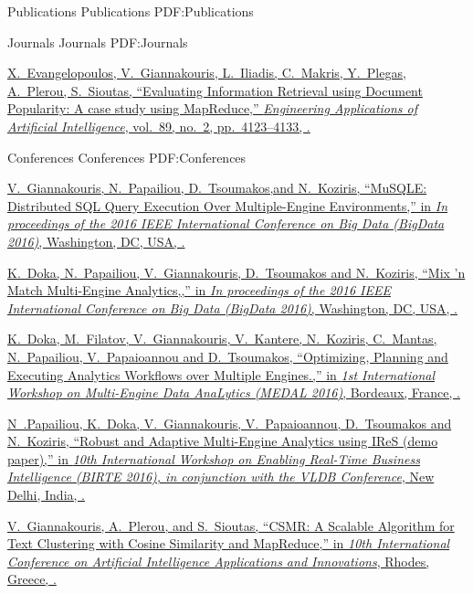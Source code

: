 
\Section
{Publications}
{Publications}
{PDF:Publications}

\SubSection
{Journals}
{Journals}
{PDF:Journals}

\begingroup
\renewcommand{\MaxNumberedItem}{[88]}

\BigGap
\NumberedItem{[1]}
\href{http://www.example.com/my-paper-doi-5}
{X.~Evangelopoulos, \underline{V.~Giannakouris}, L.~Iliadis, C.~Makris, Y.~Plegas, A.~Plerou, S.~Sioutas,
``Evaluating Information Retrieval using Document Popularity: A case
study using MapReduce,''
\textit{Engineering Applications of Artificial Intelligence},
vol.~89,
no.~2,
pp.~4123--4133,
.}

\endgroup

\BigGap
\SubSection
{Conferences}
{Conferences}
{PDF:Conferences}

\begingroup
\renewcommand{\MaxNumberedItem}{[8888]}

\BigGap
\Gap
\NumberedItem{[1]}
\href{http://www.example.com/my-paper-doi-3}
{\underline{V.~Giannakouris}, N.~Papailiou, D.~Tsoumakos,and N.~Koziris,
	``MuSQLE: Distributed SQL Query Execution Over Multiple-Engine Environments,''
	in \textit{In proceedings of the 2016 IEEE International Conference on Big Data (BigData 2016)},
	Washington, DC, USA,
	.}

\NumberedItem{[2]}
\href{http://www.example.com/my-paper-doi-3}
{K.~Doka, N.~Papailiou, \underline{V.~Giannakouris}, D.~Tsoumakos and N.~Koziris,
``Mix 'n Match Multi-Engine Analytics,,''
in \textit{In proceedings of the 2016 IEEE International Conference on Big Data (BigData 2016)},
Washington, DC, USA,
.}

\NumberedItem{[3]}
\href{http://www.example.com/my-paper-doi-3}
{K.~Doka, M.~Filatov, \underline{V.~Giannakouris}, V.~Kantere, N.~Koziris,
	C.~Mantas, N.~Papailiou, V.~Papaioannou and D.~Tsoumakos,
	``Optimizing, Planning and Executing Analytics Workflows over Multiple Engines.,''
	in \textit{1st International Workshop on Multi-Engine Data AnaLytics (MEDAL 2016)},
	Bordeaux, France,
.}

\NumberedItem{[4]}
\href{http://www.example.com/my-paper-doi-3}
{N~.Papailiou, K.~Doka, \underline{V.~Giannakouris}, V.~Papaioannou, D.~Tsoumakos and N.~Koziris,
	``Robust and Adaptive Multi-Engine Analytics using IReS (demo paper),''
	in \textit{10th International Workshop on Enabling Real-Time Business Intelligence (BIRTE 2016), in conjunction with the VLDB Conference},
	New Delhi, India,
	.}

\NumberedItem{[5]}
\href{http://www.example.com/my-paper-doi-3}
{\underline{V.~Giannakouris}, A.~Plerou, and S.~Sioutas,
	``CSMR: A Scalable Algorithm for Text Clustering with Cosine Similarity and MapReduce,''
	in \textit{10th International Conference on Artificial Intelligence Applications and Innovations},
	Rhodes, Greece,
	.}




\endgroup